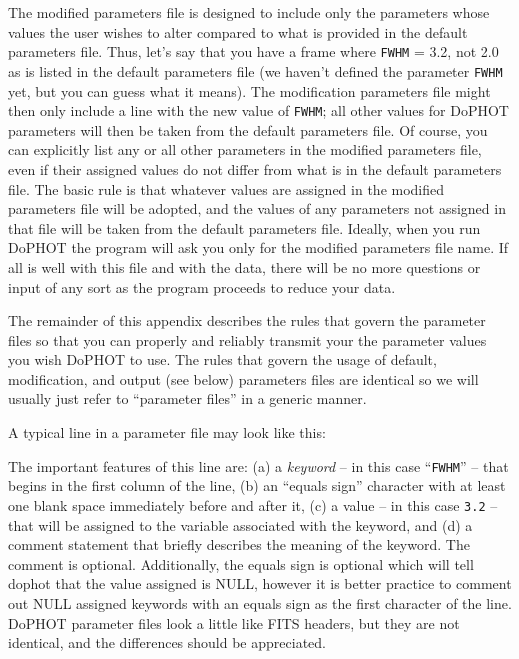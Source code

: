 The modified parameters file is designed to include only
the parameters whose values the user wishes to alter compared to what is
provided in the default parameters file.  Thus, let's say that you have
a frame where {\tt FWHM} = 3.2, not 2.0 as is listed in the default
parameters file (we haven't defined the parameter {\tt FWHM} yet, but
you can guess what it means).  The modification parameters file might
then only include a line with the new value of {\tt FWHM}; all other values
for DoPHOT parameters will then be taken from the default parameters file.
Of course, you can explicitly list any or all other parameters
in the modified parameters file, even if their assigned values do not
differ from what is in the default parameters file.  The basic rule is that
whatever values are assigned in the modified parameters file will be 
adopted, and the values of any parameters not assigned in that file will be
taken from the default parameters file.
Ideally, when you run DoPHOT the program will ask you only for the modified
parameters file name.  If all is well with this file and with the
data, there will be no more questions or input of any sort as the program
proceeds to reduce your data.  

The remainder of this appendix describes the rules that govern the
parameter files so that you can properly and reliably transmit your
the parameter values you wish DoPHOT to use.  The rules that govern the 
usage of default, modification, and output (see below) parameters files 
are identical so we will usually just refer to ``parameter files'' in a generic 
manner.

A typical line in a parameter file may look like this:


\noindent The important features of this line are:  (a) a {\it keyword}
-- in this case ``{\tt FWHM}'' -- that begins
in the first column of the line, (b) an
``equals sign'' character with at least one blank space immediately 
before and after
it, (c) a value -- in this case {\tt 3.2} -- that will be assigned to 
the variable associated with the keyword, and (d) a comment statement
that briefly describes the meaning of the keyword.  The comment is
optional.   Additionally, the equals sign is optional which will tell dophot
that the value assigned is NULL, however it is better practice to comment 
out NULL assigned keywords with an equals sign as the first character of 
the line.  DoPHOT parameter files look a little like FITS headers, but they 
are not identical, and the differences should be appreciated.

